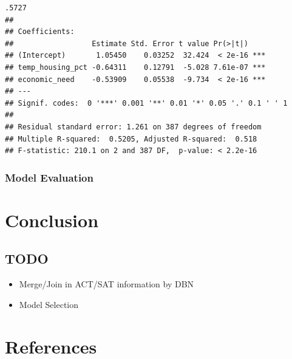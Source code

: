 \documentclass[
  man]{apa6}
\providecommand{\tightlist}{%
  \setlength{\itemsep}{0pt}\setlength{\parskip}{0pt}}
\begin{document}
\begin{verbatim}
.5727 
## 
## Coefficients:
##                  Estimate Std. Error t value Pr(>|t|)    
## (Intercept)       1.05450    0.03252  32.424  < 2e-16 ***
## temp_housing_pct -0.64311    0.12791  -5.028 7.61e-07 ***
## economic_need    -0.53909    0.05538  -9.734  < 2e-16 ***
## ---
## Signif. codes:  0 '***' 0.001 '**' 0.01 '*' 0.05 '.' 0.1 ' ' 1
## 
## Residual standard error: 1.261 on 387 degrees of freedom
## Multiple R-squared:  0.5205, Adjusted R-squared:  0.518 
## F-statistic: 210.1 on 2 and 387 DF,  p-value: < 2.2e-16
\end{verbatim}

\hypertarget{model-evaluation}{%
\subsubsection{Model Evaluation}\label{model-evaluation}}

\hypertarget{conclusion}{%
\section{Conclusion}\label{conclusion}}

\hypertarget{todo}{%
\subsection{TODO}\label{todo}}

\begin{itemize}
\tightlist
\item
  Merge/Join in ACT/SAT information by DBN
\item
  Model Selection
\end{itemize}

\newpage

\hypertarget{references}{%
\section{References}\label{references}}
\end{document}
